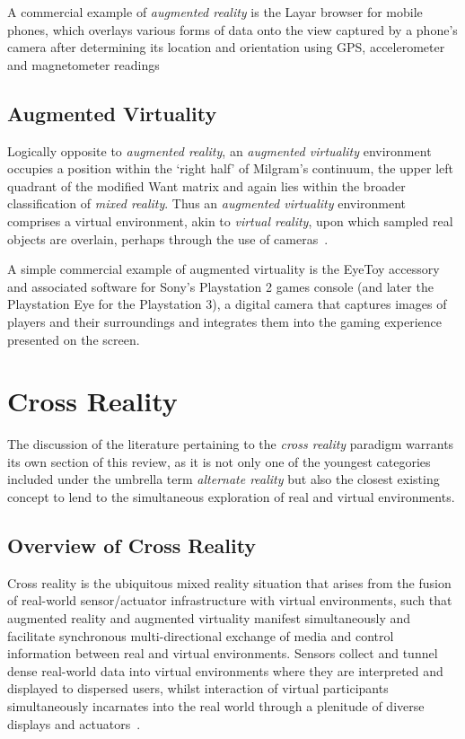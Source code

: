 A commercial example of \textit{augmented reality} is the Layar browser for mobile phones, which overlays various forms of data onto the view captured by a phone's camera after determining its location and orientation using GPS, accelerometer and magnetometer readings~\cite{eishita:layar}


\subsection{Augmented Virtuality}
Logically opposite to \textit{augmented reality}, an \textit{augmented virtuality} environment occupies a position within the `right half' of Milgram's continuum, the upper left quadrant of the modified Want matrix and again lies within the broader classification of \textit{mixed reality}. Thus an \textit{augmented virtuality} environment comprises a virtual environment, akin to \textit{virtual reality}, upon which sampled real objects are overlain, perhaps through the use of cameras~\cite{caballero:behand}.

A simple commercial example of augmented virtuality is the EyeToy accessory and associated software for Sony's Playstation 2 games console (and later the Playstation Eye for the Playstation 3), a digital camera that captures images of players and their surroundings and integrates them into the gaming experience presented on the screen.


\section{Cross Reality}

\label{sec:cross_reality}
The discussion of the literature pertaining to the \textit{cross reality} paradigm warrants its own section of this review, as it is not only one of the youngest categories included under the umbrella term \textit{alternate reality} but also the closest existing concept to lend to the simultaneous exploration of real and virtual environments.

\subsection{Overview of Cross Reality}
Cross reality is the ubiquitous mixed reality situation that arises from the fusion of real-world sensor/actuator infrastructure with virtual environments, such that augmented reality and augmented virtuality manifest simultaneously and facilitate synchronous multi-directional exchange of media and control information between real and virtual environments. Sensors collect and tunnel dense real-world data into virtual environments where they are interpreted and displayed to dispersed users, whilst interaction of virtual participants simultaneously incarnates into the real world through a plenitude of diverse displays and actuators~\cite{Paradiso2009}.

